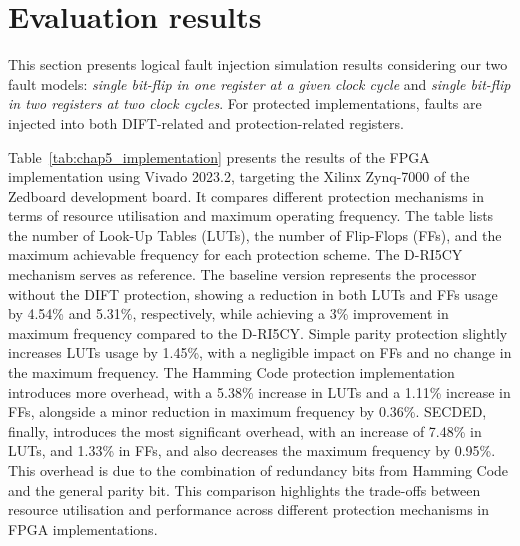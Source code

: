 \section{Evaluation results}

This section presents logical fault injection simulation results considering our two fault models: \textit{single bit-flip in one register at a given clock cycle} and \textit{single bit-flip in two registers at two clock cycles}. For protected implementations, faults are injected into both DIFT-related and protection-related registers.

Table~\ref{tab:chap5_implementation} presents the results of the FPGA implementation using Vivado 2023.2, targeting the Xilinx Zynq-7000 of the Zedboard development board. It compares different protection mechanisms in terms of resource utilisation and maximum operating frequency. The table lists the number of Look-Up Tables (LUTs), the number of Flip-Flops (FFs), and the maximum achievable frequency for each protection scheme. The D-RI5CY mechanism serves as reference. The baseline version represents the processor without the DIFT protection, showing a reduction in both LUTs and FFs usage by 4.54\% and 5.31\%, respectively, while achieving a 3\% improvement in maximum frequency compared to the D-RI5CY.
Simple parity protection slightly increases LUTs usage by 1.45\%, with a negligible impact on FFs and no change in the maximum frequency. The Hamming Code protection implementation introduces more overhead, with a 5.38\% increase in LUTs and a 1.11\% increase in FFs, alongside a minor reduction in maximum frequency by 0.36\%.
SECDED, finally, introduces the most significant overhead, with an increase of 7.48\% in LUTs, and 1.33\% in FFs, and also decreases the maximum frequency by 0.95\%. This overhead is due to the combination of redundancy bits from Hamming Code and the general parity bit.
This comparison highlights the trade-offs between resource utilisation and performance across different protection mechanisms in FPGA implementations.

